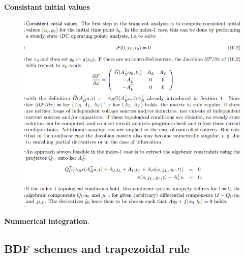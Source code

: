 \textbf{Consistant initial values} 
\begin{figure}[H]
	\centering
	\includegraphics[width=0.7\linewidth]{screenshot009}
	\caption{}
	\label{fig:screenshot009}
\end{figure}

\textbf{Nunmerical integration}.


\subsection{BDF schemes and trapezoidal rule}